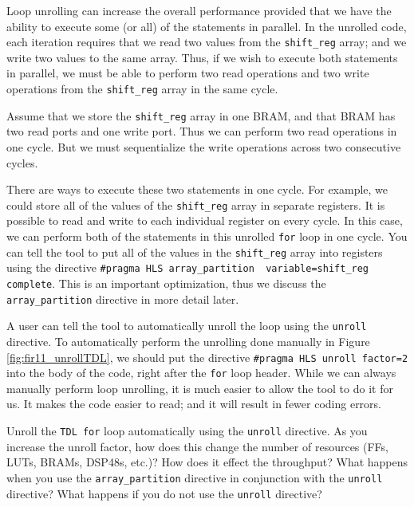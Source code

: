 Loop unrolling can increase the overall performance provided that we have the ability to execute some (or all) of the statements in parallel. In the unrolled code, each iteration requires that we read two values from the \lstinline{shift_reg} array; and we write two values to the same array. Thus, if we wish to execute both statements in parallel, we must be able to perform two read operations and two write operations from the \lstinline{shift_reg} array in the same cycle. 

Assume that we store the \lstinline{shift_reg} array in one BRAM, and that BRAM has two read ports and one write port. Thus we can perform two read operations in one cycle. But we must sequentialize the write operations across two consecutive cycles. 

There are ways to execute these two statements in one cycle. For example, we could store all of the values of the \lstinline{shift_reg} array in separate registers. It is possible to read and write to each individual register on every cycle. In this case, we can perform both of the statements in this unrolled \lstinline{for} loop in one cycle. You can tell the \VHLS tool to put all of the values in the \lstinline{shift_reg} array into registers using the directive \lstinline{#pragma HLS array_partition  variable=shift_reg complete}. This is an important optimization, thus we discuss the \lstinline{array_partition} directive in more detail later. 

A user can tell the \VHLS tool to automatically unroll the loop using the \lstinline{unroll} directive. To automatically perform the unrolling done manually in Figure \ref{fig:fir11_unrollTDL}, we should put the directive \lstinline{#pragma HLS unroll factor=2} into the body of the code, right after the \lstinline{for} loop header. While we can always manually perform loop unrolling, it is much easier to allow the tool to do it for us. It makes the code easier to read; and it will result in fewer coding errors. 

\begin{exercise}
Unroll the \lstinline{TDL for} loop automatically using the \lstinline{unroll} directive. As you increase the unroll factor, how does this change the number of resources (FFs, LUTs, BRAMs, DSP48s, etc.)? How does it effect the throughput? What happens when you use the \lstinline{array_partition} directive in conjunction with the \lstinline{unroll} directive?  What happens if you do not use the \lstinline{unroll} directive?
\end{exercise}

